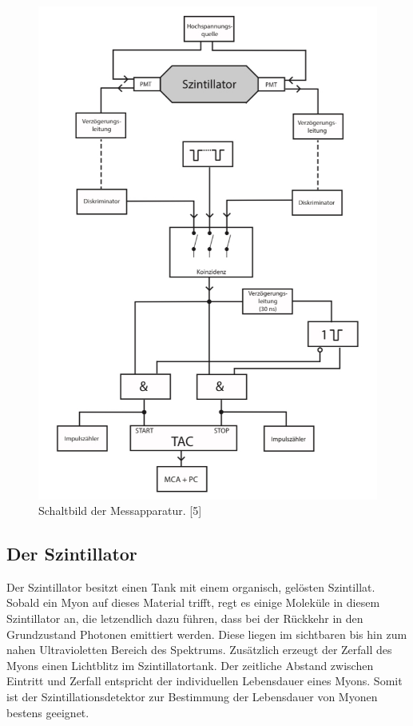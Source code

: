 \begin{figure}[H]
\centering
\includegraphics[scale=0.7]{Schaltbild.pdf}
\caption{Schaltbild der Messapparatur. [5]}
\label{fig:Schaltbild}
\end{figure}
\newpage
\subsection{Der Szintillator}
\label{sec:Szintillator}
Der Szintillator besitzt einen Tank mit einem organisch, gelösten Szintillat. Sobald ein Myon auf dieses Material trifft, regt es einige Moleküle in diesem Szintillator an, die letzendlich dazu führen, dass bei der Rückkehr in den Grundzustand Photonen emittiert werden. Diese liegen im sichtbaren bis hin zum nahen Ultravioletten Bereich des Spektrums. \newline
\noindent Zusätzlich erzeugt der Zerfall des Myons einen Lichtblitz im Szintillatortank. Der zeitliche Abstand zwischen Eintritt und Zerfall entspricht der individuellen Lebensdauer eines Myons. Somit ist der Szintillationsdetektor zur Bestimmung der Lebensdauer  von Myonen bestens geeignet.

